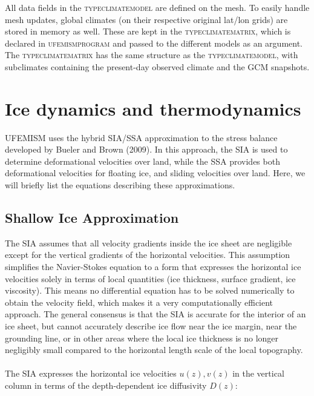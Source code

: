\documentclass{article}
\begin{document}
All data fields in the \textsc{type\textunderscore climate\textunderscore model} are defined on the mesh. To easily handle mesh updates, global climates (on their respective original lat/lon grids) are stored in memory as well. These are kept in the \textsc{type\textunderscore climate\textunderscore matrix}, which is declared in \textsc{ufemism\textunderscore program} and passed to the different models as an argument. The \textsc{type\textunderscore climate\textunderscore matrix} has the same structure as the \textsc{type\textunderscore climate\textunderscore model}, with subclimates containing the present-day observed climate and the GCM snapshots.

\newpage
\section{Ice dynamics and thermodynamics}

UFEMISM uses the hybrid SIA/SSA approximation to the stress balance developed by Bueler and Brown (2009). In this approach, the SIA is used to determine deformational velocities over land, while the SSA provides both deformational velocities for floating ice, and sliding velocities over land. Here, we will briefly list the equations describing these approximations.

\subsection{Shallow Ice Approximation}

The SIA assumes that all velocity gradients inside the ice sheet are negligible except for the vertical gradients of the horizontal velocities. This assumption simplifies the Navier-Stokes equation to a form that expresses the horizontal ice velocities solely in terms of local quantities (ice thickness, surface gradient, ice viscosity). This means no differential equation has to be solved numerically to obtain the velocity field, which makes it a very computationally efficient approach. The general consensus is that the SIA is accurate for the interior of an ice sheet, but cannot accurately describe ice flow near the ice margin, near the grounding line, or in other areas where the local ice thickness is no longer negligibly small compared to the horizontal length scale of the local topography.\\
\\
The SIA expresses the horizontal ice velocities $u(z),v(z)$ in the vertical column in terms of the depth-dependent ice diffusivity $D(z)$:
\end{document}

